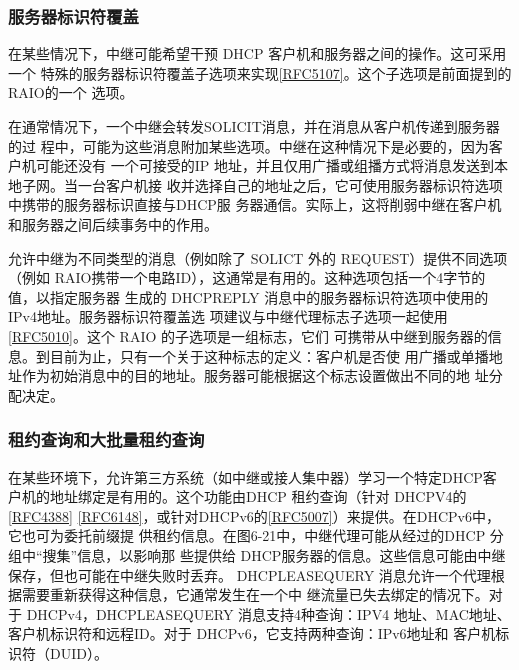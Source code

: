 \subsubsection{服务器标识符覆盖}
在某些情况下，中继可能希望干预 DHCP 客户机和服务器之间的操作。这可采用一个
特殊的服务器标识符覆盖子选项来实现\href{https://www.rfc-editor.org/rfc/rfc5107}{\href{https://www.rfc-editor.org/rfc/rfc5107}{[RFC5107]}}。这个子选项是前面提到的 RAIO的一个
选项。

在通常情况下，一个中继会转发SOLICIT消息，并在消息从客户机传递到服务器的过
程中，可能为这些消息附加某些选项。中继在这种情况下是必要的，因为客户机可能还没有
一个可接受的IP 地址，并且仅用广播或组播方式将消息发送到本地子网。当一台客户机接
收并选择自己的地址之后，它可使用服务器标识符选项中携带的服务器标识直接与DHCP服
务器通信。实际上，这将削弱中继在客户机和服务器之间后续事务中的作用。

允许中继为不同类型的消息（例如除了 SOLICT 外的 REQUEST）提供不同选项（例如
RAIO携带一个电路ID），这通常是有用的。这种选项包括一个4字节的值，以指定服务器
生成的 DHCPREPLY 消息中的服务器标识符选项中使用的IPv4地址。服务器标识符覆盖选
项建议与中继代理标志子选项一起使用\href{https://www.rfc-editor.org/rfc/rfc5010}{\href{https://www.rfc-editor.org/rfc/rfc5010}{[RFC5010]}}。这个 RAIO 的子选项是一组标志，它们
可携带从中继到服务器的信息。到目前为止，只有一个关于这种标志的定义：客户机是否使
用广播或单播地址作为初始消息中的目的地址。服务器可能根据这个标志设置做出不同的地
址分配决定。

\subsubsection{租约查询和大批量租约查询}
在某些环境下，允许第三方系统（如中继或接人集中器）学习一个特定DHCP客
户机的地址绑定是有用的。这个功能由DHCP 租约查询（针对 DHCPV4的\href{https://www.rfc-editor.org/rfc/rfc4388}{\href{https://www.rfc-editor.org/rfc/rfc4388}{[RFC4388]}}
\href{https://www.rfc-editor.org/rfc/rfc6148}{\href{https://www.rfc-editor.org/rfc/rfc6148}{[RFC6148]}}，或针对DHCPv6的\href{https://www.rfc-editor.org/rfc/rfc5007}{\href{https://www.rfc-editor.org/rfc/rfc5007}{[RFC5007]}}）来提供。在DHCPv6中，它也可为委托前缀提
供租约信息。在图6-21中，中继代理可能从经过的DHCP 分组中“搜集”信息，以影响那
些提供给 DHCP服务器的信息。这些信息可能由中继保存，但也可能在中继失败时丢弃。
DHCPLEASEQUERY 消息允许一个代理根据需要重新获得这种信息，它通常发生在一个中
继流量已失去绑定的情况下。对于 DHCPv4，DHCPLEASEQUERY 消息支持4种查询：IPV4
地址、MAC地址、客户机标识符和远程ID。对于 DHCPv6，它支持两种查询：IPv6地址和
客户机标识符（DUID）。

